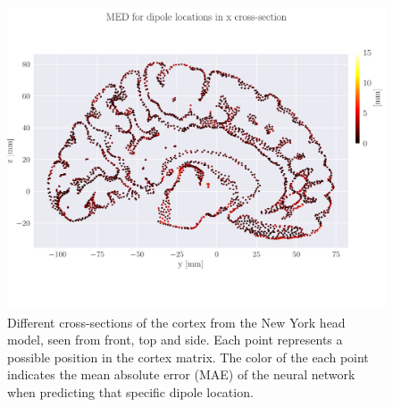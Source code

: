 \documentclass[a4paper, UKenglish, 11pt]{uiomaster}
\begin{document}
\begin{figure}[!htb]
    \includegraphics[width=0.7\linewidth]{figures/MED_simple_dipole_error_Euclidean Distance_2.pdf}
    \caption{Different cross-sections of the cortex from the New York head model, seen from front, top and side. Each point represents a possible position in the cortex matrix. The color of the each point indicates the mean absolute error (MAE) of the neural network when predicting that specific dipole location.}
    \label{fig:MED_crossections}
\end{figure}
\end{document}
